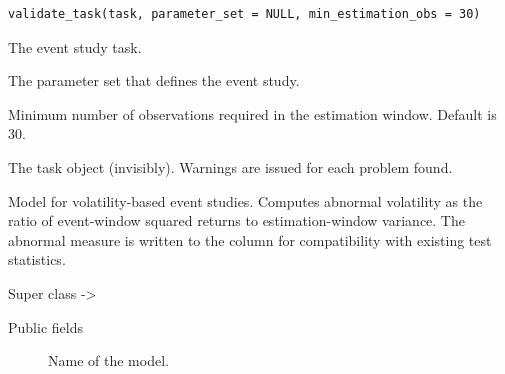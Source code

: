 \documentclass[a4paper]{book}
\begin{document}
%
\begin{Usage}
\begin{verbatim}
validate_task(task, parameter_set = NULL, min_estimation_obs = 30)
\end{verbatim}
\end{Usage}
%
\begin{Arguments}
\begin{ldescription}
\item[\code{task}] The event study task.

\item[\code{parameter\_set}] The parameter set that defines the event study.

\item[\code{min\_estimation\_obs}] Minimum number of observations required in the
estimation window. Default is 30.
\end{ldescription}
\end{Arguments}
%
\begin{Value}
The task object (invisibly). Warnings are issued for each problem found.
\end{Value}
%
\begin{Description}
Model for volatility-based event studies. Computes abnormal volatility
as the ratio of event-window squared returns to estimation-window variance.
The abnormal measure is written to the  column
for compatibility with existing test statistics.
\end{Description}
%
\begin{Section}{Super class}
 -> 
\end{Section}
%
\begin{Section}{Public fields}

\begin{description}

\item[] Name of the model.

\end{description}


\end{Section}
%
\end{document}
